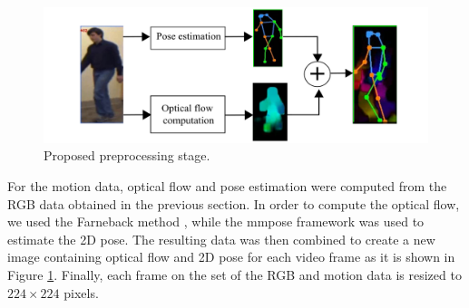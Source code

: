 \documentclass[mathematics,article,submit,pdftex,moreauthors]{Definitions/mdpi}
\begin{document}

\begin{figure}[!ht]
     \centering
     \includegraphics[width=1\textwidth]{Definitions/preprocess.png}
     \caption{Proposed preprocessing stage. \label{fig:preprocessing}}     
\end{figure}



For the motion data, optical flow and pose estimation were computed from the RGB data obtained in the previous section. 
In order to compute the optical flow, we used the Farneback method \cite{farneback}, while the mmpose framework \cite{mmpose2020} was used to estimate the 2D pose. The resulting data was then combined to create a new image containing optical flow and 2D pose for each video frame as it is shown in Figure \ref{fig:preprocessing}. Finally, each frame on the set of the RGB and motion data is resized to $224 \times 224$ pixels.
\end{document}
